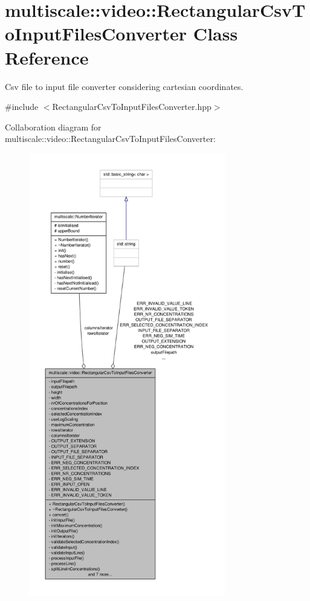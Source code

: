 \hypertarget{classmultiscale_1_1video_1_1RectangularCsvToInputFilesConverter}{\section{multiscale\-:\-:video\-:\-:\-Rectangular\-Csv\-To\-Input\-Files\-Converter \-Class \-Reference}
\label{classmultiscale_1_1video_1_1RectangularCsvToInputFilesConverter}
}


\-Csv file to input file converter considering cartesian coordinates.  




{\ttfamily \#include $<$\-Rectangular\-Csv\-To\-Input\-Files\-Converter.\-hpp$>$}



\-Collaboration diagram for multiscale\-:\-:video\-:\-:\-Rectangular\-Csv\-To\-Input\-Files\-Converter\-:
\nopagebreak
\begin{figure}[H]
\begin{center}
\leavevmode
\includegraphics[height=550pt]{classmultiscale_1_1video_1_1RectangularCsvToInputFilesConverter__coll__graph}
\end{center}
\end{figure}
